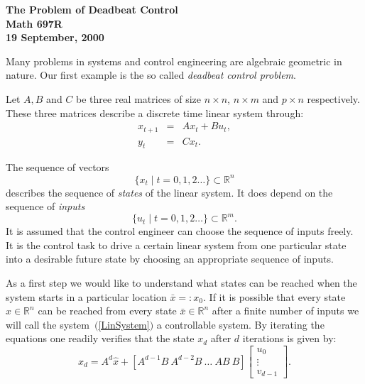 \documentclass[12pt]{report}
\numberwithin{equation}{chapter}
\numberwithin{figure}{chapter}
\newcommand{\R}{\mathbb{R}}
\newcommand{\eqr}[1]{~\mbox{$(${\rm \ref{#1}}$)$}}
\begin{document}
 
\begin{center}
\Large\bf The Problem of Deadbeat Control\\
Math 697R\\
19 September, 2000
\end{center}




Many problems in systems and control engineering are algebraic
geometric in nature. Our first example is the so called {\em
  deadbeat control problem}. 

Let $A,B$ and $C$ be three real matrices of size $n\times n$,
$n\times m$ and $p\times n$ respectively. These three matrices
describe a discrete time linear system 
through:
\begin{equation}                          \label{LinSystem}
  \begin{array}{rcl}
    x_{t+1} & = & Ax_t+Bu_t,\\
     y_{t} & = & Cx_t.
  \end{array}
\end{equation}

The sequence of vectors
$$
\{x_t\mid t=0,1,2\ldots\}\subset \R^n
$$
describes the sequence of {\em states}
%
of the linear system. It does depend on the sequence of {\em
  inputs}
$$
\{u_t\mid t=0,1,2\ldots\}\subset \R^m.
$$
 It is assumed that the control
engineer can choose the sequence of inputs freely. It is the
control task to drive a certain linear system from one particular
state into a desirable future state by choosing an appropriate
sequence of inputs.

As a first step we would like to understand what states can be
reached when the system starts in a particular location
$\bar{x}=:x_0$. If it is possible that every state
$\hat{x}\in\R^n$ can be reached from every state $\bar{x}\in\R^n$
after a finite number of inputs we will call the
system\eqr{LinSystem} a controllable system.
%
By iterating the equations one readily verifies
that the state $x_d$ after $d$ iterations is given by:
$$
x_d=A^d\hat{x}+\left[ A^{d-1}B\ A^{d-2}B\ \ldots \ AB\ 
  B\right] \left[
\begin{array}{c}
u_0\\ \vdots \\ v_{d-1}
\end{array}
\right].
$$
\end{document}
